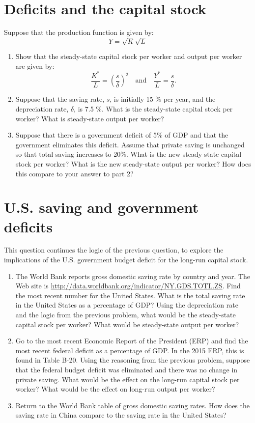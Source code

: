\documentclass[]{book}
\theoremstyle{definition}
\theoremstyle{definition}
\theoremstyle{definition}
\theoremstyle{remark}
\begin{document}
\section{Deficits and the capital
stock}\label{deficits-and-the-capital-stock}

Suppose that the production function is given by: \[Y=\sqrt{K}\sqrt{L}\]

\begin{enumerate}
\def\labelenumi{\arabic{enumi}.}
\item
  Show that the steady-state capital stock per worker and output per
  worker are given by:
  \[\frac{K^{*}}{L}=\left(\frac{s}{\delta}\right)^{2} \quad \text{and} \quad \frac{Y^{*}}{L}=\frac{s}{\delta}.\]
\item
  Suppose that the saving rate, \(s\), is initially 15 \% per year, and
  the depreciation rate, \(\delta\), is 7.5 \%. What is the steady-state
  capital stock per worker? What is steady-state output per worker?
\item
  Suppose that there is a government deficit of 5\% of GDP and that the
  government eliminates this deficit. Assume that private saving is
  unchanged so that total saving increases to 20\%. What is the new
  steady-state capital stock per worker? What is the new steady-state
  output per worker? How does this compare to your answer to part 2?
\end{enumerate}

\section{U.S. saving and government
deficits}\label{u.s.-saving-and-government-deficits}

This question continues the logic of the previous question, to explore
the implications of the U.S. government budget deficit for the long-run
capital stock.

\begin{enumerate}
\def\labelenumi{\arabic{enumi}.}
\item
  The World Bank reports gross domestic saving rate by country and year.
  The Web site is
  \url{http://data.worldbank.org/indicator/NY.GDS.TOTL.ZS}. Find the
  most recent number for the United States. What is the total saving
  rate in the United States as a percentage of GDP? Using the
  depreciation rate and the logic from the previous problem, what would
  be the steady-state capital stock per worker? What would be
  steady-state output per worker?
\item
  Go to the most recent Economic Report of the President (ERP) and find
  the most recent federal deficit as a percentage of GDP. In the 2015
  ERP, this is found in Table B-20. Using the reasoning from the
  previous problem, suppose that the federal budget deficit was
  eliminated and there was no change in private saving. What would be
  the effect on the long-run capital stock per worker? What would be the
  effect on long-run output per worker?
\item
  Return to the World Bank table of gross domestic saving rates. How
  does the saving rate in China compare to the saving rate in the United
  States?
\end{enumerate}
\end{document}
